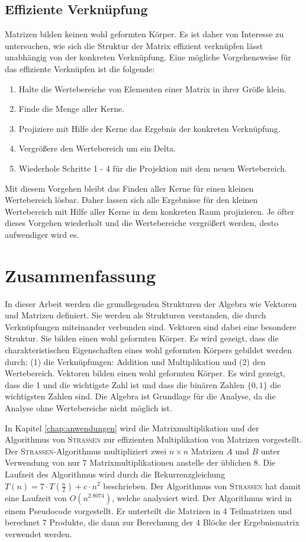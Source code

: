 \documentclass{report}
\numberwithin{equation}{section}
\begin{document}
\section{Effiziente Verknüpfung}
Matrizen bilden keinen wohl geformten Körper. Es ist daher von Interesse zu untersuchen, wie sich die Struktur der Matrix effizient verknüpfen lässt unabhängig von der konkreten Verknüpfung. Eine mögliche Vorgehensweise für das effiziente Verknüpfen ist die folgende: 
\begin{enumerate}
	\item Halte die Wertebereiche von Elementen einer Matrix in ihrer Größe klein.
	\item Finde die Menge aller Kerne.
	\item Projiziere mit Hilfe der Kerne das Ergebnis der konkreten Verknüpfung.
	\item Vergrößere den Wertebereich um ein Delta.
	\item Wiederhole Schritte 1 - 4 für die Projektion mit dem neuen Wertebereich.
\end{enumerate}
Mit diesem Vorgehen bleibt das Finden aller Kerne für einen kleinen Wertebereich lösbar. Daher lassen sich alle Ergebnisse für den kleinen Wertebereich mit Hilfe aller Kerne in dem konkreten Raum projizieren. Je öfter dieses Vorgehen wiederholt und die Wertebereiche vergrößert werden, desto aufwendiger wird es.

\chapter{Zusammenfassung}
In dieser Arbeit werden die grundlegenden Strukturen der Algebra wie Vektoren und Matrizen definiert. Sie werden als Strukturen verstanden, die durch Verknüpfungen miteinander verbunden sind. Vektoren sind dabei eine besondere Struktur. Sie bilden einen wohl geformten Körper. Es wird gezeigt, dass die charakteristischen Eigenschaften eines wohl geformten Körpers gebildet werden durch: (1) die Verknüpfungen: Addition und Multiplikation und (2) den Wertebereich. Vektoren bilden einen wohl geformten Körper. Es wird gezeigt, dass die 1 und die wichtigste Zahl ist und dass die binären Zahlen $\{0, 1\}$ die wichtigsten Zahlen sind. Die Algebra ist Grundlage für die Analyse, da die Analyse ohne Wertebereiche nicht möglich ist.

In Kapitel \ref{chap:anwendungen} wird die Matrixmultiplikation und der Algorithmus von \textsc{Strassen} zur effizienten Multiplikation von Matrizen vorgestellt. Der \textsc{Strassen}-Algorithmus multipliziert zwei $n \times n$ Matrizen $A$ und $B$ unter Verwendung von nur 7 Matrixmultiplikationen anstelle der üblichen 8. Die Laufzeit des Algorithmus wird durch die Rekurrenzgleichung $T(n) = 7 \cdot T\left(\frac{n}{2}\right) + c \cdot n^2$ beschrieben. Der Algorithmus von \textsc{Strassen} hat damit eine Laufzeit von $O(n^{2.8074})$, welche analysiert wird. Der Algorithmus wird in einem Pseudocode vorgestellt. Er unterteilt die Matrizen in 4 Teilmatrizen und berechnet 7 Produkte, die dann zur Berechnung der 4 Blöcke der Ergebnismatrix verwendet werden.
\end{document}
